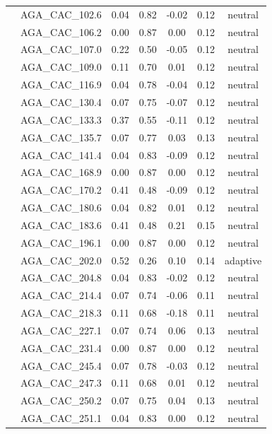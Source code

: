 \documentclass[11pt,]{article}
\begin{document}
\begin{longtable}[c]{@{}lcccccc@{}}
& AGA\_CAC\_102.6 & 0.04 & 0.82 & -0.02 & 0.12 & neutral
\\\addlinespace
& AGA\_CAC\_106.2 & 0.00 & 0.87 & 0.00 & 0.12 & neutral
\\\addlinespace
& AGA\_CAC\_107.0 & 0.22 & 0.50 & -0.05 & 0.12 & neutral
\\\addlinespace
& AGA\_CAC\_109.0 & 0.11 & 0.70 & 0.01 & 0.12 & neutral
\\\addlinespace
& AGA\_CAC\_116.9 & 0.04 & 0.78 & -0.04 & 0.12 & neutral
\\\addlinespace
& AGA\_CAC\_130.4 & 0.07 & 0.75 & -0.07 & 0.12 & neutral
\\\addlinespace
& AGA\_CAC\_133.3 & 0.37 & 0.55 & -0.11 & 0.12 & neutral
\\\addlinespace
& AGA\_CAC\_135.7 & 0.07 & 0.77 & 0.03 & 0.13 & neutral
\\\addlinespace
& AGA\_CAC\_141.4 & 0.04 & 0.83 & -0.09 & 0.12 & neutral
\\\addlinespace
& AGA\_CAC\_168.9 & 0.00 & 0.87 & 0.00 & 0.12 & neutral
\\\addlinespace
& AGA\_CAC\_170.2 & 0.41 & 0.48 & -0.09 & 0.12 & neutral
\\\addlinespace
& AGA\_CAC\_180.6 & 0.04 & 0.82 & 0.01 & 0.12 & neutral
\\\addlinespace
& AGA\_CAC\_183.6 & 0.41 & 0.48 & 0.21 & 0.15 & neutral
\\\addlinespace
& AGA\_CAC\_196.1 & 0.00 & 0.87 & 0.00 & 0.12 & neutral
\\\addlinespace
& AGA\_CAC\_202.0 & 0.52 & 0.26 & 0.10 & 0.14 & adaptive
\\\addlinespace
& AGA\_CAC\_204.8 & 0.04 & 0.83 & -0.02 & 0.12 & neutral
\\\addlinespace
& AGA\_CAC\_214.4 & 0.07 & 0.74 & -0.06 & 0.11 & neutral
\\\addlinespace
& AGA\_CAC\_218.3 & 0.11 & 0.68 & -0.18 & 0.11 & neutral
\\\addlinespace
& AGA\_CAC\_227.1 & 0.07 & 0.74 & 0.06 & 0.13 & neutral
\\\addlinespace
& AGA\_CAC\_231.4 & 0.00 & 0.87 & 0.00 & 0.12 & neutral
\\\addlinespace
& AGA\_CAC\_245.4 & 0.07 & 0.78 & -0.03 & 0.12 & neutral
\\\addlinespace
& AGA\_CAC\_247.3 & 0.11 & 0.68 & 0.01 & 0.12 & neutral
\\\addlinespace
& AGA\_CAC\_250.2 & 0.07 & 0.75 & 0.04 & 0.13 & neutral
\\\addlinespace
& AGA\_CAC\_251.1 & 0.04 & 0.83 & 0.00 & 0.12 & neutral

\end{longtable}
\end{document}
